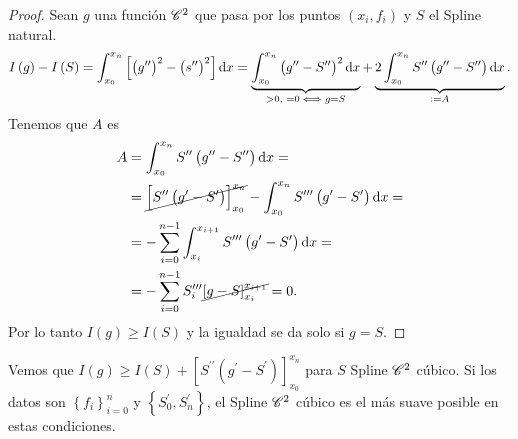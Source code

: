 \begin{proof}
    Sean $g$ una función $\mathscr{C}^2$ que pasa por los puntos $\left( x_i, f_i \right)$ y $S$ el Spline natural.
    \[
        I\left( g \right) - I \left( S \right) = \int_{x_0}^{x_n} \left[ \left( g^{\prime\prime} \right)^2 - \left( s^{\prime\prime} \right)^2 \right] \dif x = \underbrace{\int_{x_0}^{x_n} \left( g^{\prime\prime}-S^{\prime\prime} \right)^2 \dif x}_{>0,\,\, =0 \iff g=S} + \underbrace{2\int_{x_0}^{x_n} S^{\prime\prime}\left( g^{\prime\prime} - S^{\prime\prime} \right) \dif x}_{:= A}.
    \]
    Tenemos que $A$ es
    \begin{align*}
        A &= \int_{x_0}^{x_n} S^{\prime\prime}\left( g^{\prime\prime}-S^{\prime\prime} \right) \dif x = \\ &= \cancel{\left[ S^{\prime\prime}\left( g^{\prime} - S^{\prime} \right) \right]_{x_0}^{x_n}} - \int_{x_0}^{x_n} S^{\prime\prime\prime}\left( g^{\prime}-S^{\prime} \right) \dif x = \\
        &= -\sum_{i=0}^{n-1} \int_{x_i}^{x_{i+1}} S^{\prime\prime\prime}\left( g^{\prime}-S^{\prime} \right) \dif x  = \\ &= -\sum_{i=0}^{n-1} S^{\prime\prime\prime}_i\cancel{\left[ g-S \right]_{x_i}^{x_{i+1}}} = 0.
    \end{align*}
    Por lo tanto $I\left( g \right) \geq I\left( S \right)$ y la igualdad se da solo si $g = S$.
\end{proof}

\begin{obs}
    Vemos que $I\left( g \right) \geq I\left( S \right) + \left[ S^{\prime\prime}\left( g^{\prime}-S^{\prime} \right) \right]_{x_0}^{x_n}$ para $S$ Spline $\mathscr{C}^2$ cúbico. Si los datos son $\left\{ f_i \right\}_{i=0}^n$ y $\left\{ S^{\prime}_0, S^{\prime}_n \right\}$, el Spline $\mathscr{C}^2$ cúbico es el más suave posible en estas condiciones.
\end{obs}

